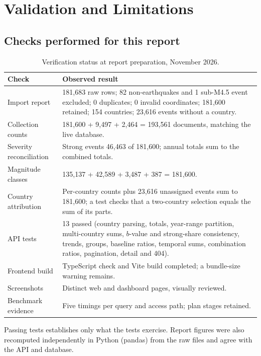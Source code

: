 \documentclass[11pt,a4paper]{article}
\begin{document}
\section{Validation and Limitations}
\subsection{Checks performed for this report}
\begin{table}[H]\centering
\caption{Verification status at report preparation, November 2026.}
\begin{tabularx}{\linewidth}{lX}\toprule
Check & Observed result\\\midrule
Import report & 181,683 raw rows; 82 non-earthquakes and 1 sub-M4.5 event excluded; 0 duplicates; 0 invalid coordinates; 181,600 retained; 154 countries; 23,616 events without a country.\\
Collection counts & 181,600 + 9,497 + 2,464 = 193,561 documents, matching the live database.\\
Severity reconciliation & Strong events 46,463 of 181,600; annual totals sum to the combined totals.\\
Magnitude classes & 135,137 + 42,589 + 3,487 + 387 = 181,600.\\
Country attribution & Per-country counts plus 23,616 unassigned events sum to 181,600; a test checks that a two-country selection equals the sum of its parts.\\
API tests & 13 passed (country parsing, totals, year-range partition, multi-country sums, $b$-value and strong-share consistency, trends, groups, baseline ratios, temporal sums, combination ratios, pagination, detail and 404).\\
Frontend build & TypeScript check and Vite build completed; a bundle-size warning remains.\\
Screenshots & Distinct web and dashboard pages, visually reviewed.\\
Benchmark evidence & Five timings per query and access path; plan stages retained.\\\bottomrule
\end{tabularx}
\end{table}
Passing tests establishes only what the tests exercise. Report figures were also recomputed independently in Python (pandas) from the raw files and agree with the API and database.
\end{document}
